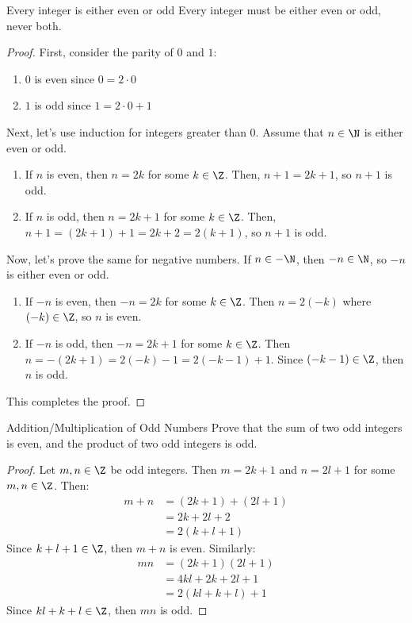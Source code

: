 \documentclass[letterpaper,12pt]{report}
\begin{document}
\begin{thmbox}{Every integer is either even or odd}{}
	Every integer must be either even or odd, never both.
	\tcblower
	\begin{proof}
		First, consider the parity of $0$ and $1$:
		\begin{enumerate}
			\item $0$ is even since $0 = 2 \cdot 0$
			\item $1$ is odd since $1 = 2 \cdot 0 + 1$
		\end{enumerate}

		Next, let's use induction for integers greater than 0. Assume that $n \in \N$ is either even or odd.
		\begin{enumerate}
			\item If $n$ is even, then $n = 2k$ for some $k \in \Z$. Then, $n+1 = 2k+1$, so $n+1$ is odd.
			\item If $n$ is odd, then $n = 2k+1$ for some $k \in \Z$. Then, $n+1 = (2k+1) +1 = 2k+2 = 2(k+1)$, so $n+1$ is odd.
		\end{enumerate}

		Now, let's prove the same for negative numbers. If $n \in -\N$, then $-n \in \N$, so $-n$ is either even or odd.
		\begin{enumerate}
			\item If $-n$ is even, then $-n = 2k$ for some $k \in \Z$. Then $n = 2(-k)$ where $(-k) \in \Z$, so $n$ is even.
			\item If $-n$ is odd, then $-n = 2k + 1$ for some $k \in \Z$. Then $n = -(2k+1) = 2(-k) - 1 = 2(-k-1) +1$. Since $(-k-1) \in \Z$, then $n$ is odd.
		\end{enumerate}
		This completes the proof.
	\end{proof}
\end{thmbox}

\begin{exbox}{Addition/Multiplication of Odd Numbers}{}
	Prove that the sum of two odd integers is even, and the product of two odd integers is odd.
	\tcblower
	\begin{proof}
		Let $m,n \in \Z$ be odd integers. Then $m = 2k+1$ and $n = 2l+1$ for some $m, n \in \Z$. Then:
		\begin{align*}
			m+n &= (2k+1) + (2l+1) \\
			&= 2k+2l+2 \\
			&= 2(k+l+1)
		\end{align*}
		Since $k+l+1 \in \Z$, then $m+n$ is even. Similarly:
		\begin{align*}
			mn &= (2k+1)(2l+1) \\
			&= 4kl + 2k + 2l + 1 \\
			&= 2(kl + k + l) + 1
		\end{align*}
		Since $kl + k + l \in \Z$, then $mn$ is odd.
	\end{proof}
\end{exbox}
\end{document}
